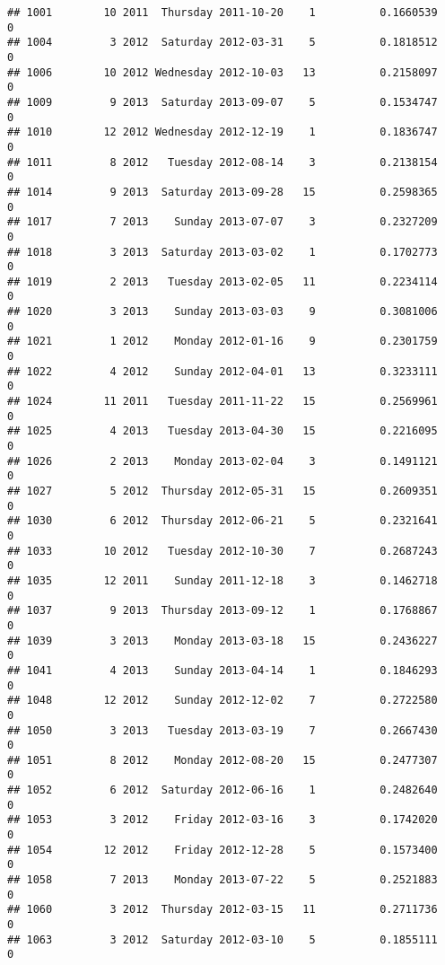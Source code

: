 \documentclass[
]{article}
\begin{document}
\begin{verbatim}
## 1001        10 2011  Thursday 2011-10-20    1          0.1660539             0
## 1004         3 2012  Saturday 2012-03-31    5          0.1818512             0
## 1006        10 2012 Wednesday 2012-10-03   13          0.2158097             0
## 1009         9 2013  Saturday 2013-09-07    5          0.1534747             0
## 1010        12 2012 Wednesday 2012-12-19    1          0.1836747             0
## 1011         8 2012   Tuesday 2012-08-14    3          0.2138154             0
## 1014         9 2013  Saturday 2013-09-28   15          0.2598365             0
## 1017         7 2013    Sunday 2013-07-07    3          0.2327209             0
## 1018         3 2013  Saturday 2013-03-02    1          0.1702773             0
## 1019         2 2013   Tuesday 2013-02-05   11          0.2234114             0
## 1020         3 2013    Sunday 2013-03-03    9          0.3081006             0
## 1021         1 2012    Monday 2012-01-16    9          0.2301759             0
## 1022         4 2012    Sunday 2012-04-01   13          0.3233111             0
## 1024        11 2011   Tuesday 2011-11-22   15          0.2569961             0
## 1025         4 2013   Tuesday 2013-04-30   15          0.2216095             0
## 1026         2 2013    Monday 2013-02-04    3          0.1491121             0
## 1027         5 2012  Thursday 2012-05-31   15          0.2609351             0
## 1030         6 2012  Thursday 2012-06-21    5          0.2321641             0
## 1033        10 2012   Tuesday 2012-10-30    7          0.2687243             0
## 1035        12 2011    Sunday 2011-12-18    3          0.1462718             0
## 1037         9 2013  Thursday 2013-09-12    1          0.1768867             0
## 1039         3 2013    Monday 2013-03-18   15          0.2436227             0
## 1041         4 2013    Sunday 2013-04-14    1          0.1846293             0
## 1048        12 2012    Sunday 2012-12-02    7          0.2722580             0
## 1050         3 2013   Tuesday 2013-03-19    7          0.2667430             0
## 1051         8 2012    Monday 2012-08-20   15          0.2477307             0
## 1052         6 2012  Saturday 2012-06-16    1          0.2482640             0
## 1053         3 2012    Friday 2012-03-16    3          0.1742020             0
## 1054        12 2012    Friday 2012-12-28    5          0.1573400             0
## 1058         7 2013    Monday 2013-07-22    5          0.2521883             0
## 1060         3 2012  Thursday 2012-03-15   11          0.2711736             0
## 1063         3 2012  Saturday 2012-03-10    5          0.1855111             0

\end{verbatim}
\end{document}
